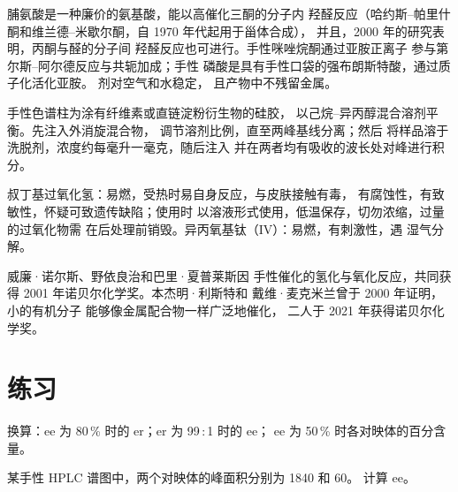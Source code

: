 脯氨酸是一种廉价的氨基酸，能以高催化三酮的分子内
羟醛反应（哈约斯–帕里什酮和维兰德–米歇尔酮，自 1970 年代起用于甾体合成），
并且，2000 年的研究表明，丙酮与醛的分子间
羟醛反应也可进行。手性咪唑烷酮通过亚胺正离子
参与第尔斯–阿尔德反应与共轭加成；手性
磷酸是具有手性口袋的强布朗斯特酸，通过质子化活化亚胺。
剂对空气和水稳定，
且产物中不残留金属。

\begin{inthelab}[手性 HPLC 分析]
手性色谱柱为涂有纤维素或直链淀粉衍生物的硅胶，
以己烷–异丙醇混合溶剂平衡。先注入外消旋混合物，
调节溶剂比例，直至两峰基线分离；然后
将样品溶于洗脱剂，浓度约每毫升一毫克，随后注入
并在两者均有吸收的波长处对峰进行积分。
\end{inthelab}

\begin{safety}{}
叔丁基过氧化氢：易燃，受热时易自身反应，与皮肤接触有毒，
有腐蚀性，有致敏性，怀疑可致遗传缺陷；使用时
以溶液形式使用，低温保存，切勿浓缩，过量的过氧化物需
在后处理前销毁。异丙氧基钛（IV）：易燃，有刺激性，遇
湿气分解。
\end{safety}

\begin{history}[非对称催化的两项诺贝尔奖]
威廉·诺尔斯、野依良治和巴里·夏普莱斯因
手性催化的氢化与氧化反应，共同获得 2001 年诺贝尔化学奖。本杰明·利斯特和
戴维·麦克米兰曾于 2000 年证明，小的有机分子
能够像金属配合物一样广泛地催化，
二人于 2021 年获得诺贝尔化学奖。
\end{history}

\section{练习}

\begin{exercise}[$\star$]\label{exo:b3:asymmetric-synthesis:1}
换算：ee 为 80\,\% 时的 er；er 为 99\,:\,1 时的 ee；
ee 为 50\,\% 时各对映体的百分含量。
\end{exercise}

\begin{exercise}[$\star$]\label{exo:b3:asymmetric-synthesis:2}
某手性 HPLC 谱图中，两个对映体的峰面积分别为 1840 和 60。
计算 ee。
\end{exercise}

